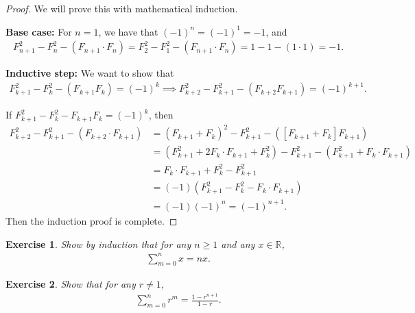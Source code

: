 \documentclass{article}[12pt]
\newtheorem{exercise}{Exercise}[section]
\newcommand{\R}{\mathbb{R}}
\begin{document}
        \begin{proof}
            We will prove this with mathematical induction.
            
            \textbf{Base case:} For $n = 1$, we have that $(-1)^n = (-1)^1 = -1$, and
            \begin{align}
                F_{n+1}^2 - F_{n}^2 - (F_{n+1} \cdot F_{n})
                = F_2^2 - F_1^2 - (F_{n+1} \cdot F_{n})
                = 1 - 1 - (1 \cdot 1)
                = - 1.
            \end{align}
            
            \textbf{Inductive step:} We want to show that
            \begin{align}
                F_{k+1}^2 - F_{k}^2 - (F_{k+1} F_{k}) = (-1)^k
                \implies
                F_{k+2}^2 - F_{k+1}^2 - (F_{k+2} F_{k+1}) = (-1)^{k+1}.
            \end{align}
            
            If $F_{k+1}^2 - F_{k}^2 - F_{k+1} F_{k} = (-1)^k$, then
            \begin{align}
                F_{k+2}^2 - F_{k+1}^2 - (F_{k+2} \cdot F_{k+1})
                &= (F_{k+1} + F_{k})^2 - F_{k+1}^2 - ([F_{k+1} + F_{k}] F_{k+1})
                \\
                &= (F_{k+1}^2 + 2 F_{k} \cdot F_{k+1} + F_{k}^2) - F_{k+1}^2 - (F_{k+1}^2 + F_{k} \cdot F_{k+1})
                \\
                &= F_{k} \cdot F_{k+1} + F_{k}^2 - F_{k+1}^2
                \\
                &= (-1)(F_{k+1}^2 - F_{k}^2 - F_{k} \cdot F_{k+1})
                \\
                &= (-1)(-1)^n = (-1)^{n + 1}.
            \end{align}
            Then the induction proof is complete.
        \end{proof}
        
        
        \begin{exercise}
            Show by induction that for any $n \ge 1$ and any $x \in \R$,
            \begin{align}
                \sum_{m=0}^n x = n x.
            \end{align}
        \end{exercise}
        
        \begin{exercise}
            Show that for any $r \ne 1$,
            \begin{align}
                \sum_{m=0}^n r^m = \frac{1 - r^{n+1}}{1 - r}.
            \end{align}
        \end{exercise}
        
\end{document}
